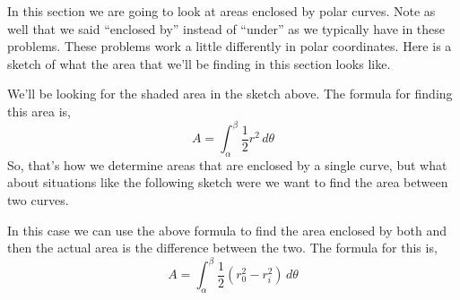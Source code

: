 \documentclass[10pt,reqno]{book}
\theoremstyle{definition}
\begin{document}
	In this section we are going to look at areas enclosed by polar curves. Note as well that we said ``enclosed by'' instead of ``under'' as we typically have in these problems. These problems work a little differently in polar coordinates. Here is a sketch of what the area that we'll be finding in this section looks like.
	\begin{center}
	\end{center}
	We'll be looking for the shaded area in the sketch above. The formula for finding this area is,
	\[ A = \int_{\alpha}^{\beta} \frac{1}{2}r^2\,d\theta \]
	So, that's how we determine areas that are enclosed by a single curve, but what about situations like the following sketch were we want to find the area between two curves.
		\begin{center}
	\end{center}
	In this case we can use the above formula to find the area enclosed by both and then the actual area is the difference between the two.  The formula for this is,
	\[ A = \int_{\alpha}^{\beta} \frac{1}{2} (r_0^2 - r_i^2)\,d\theta \]
	
\end{document}
